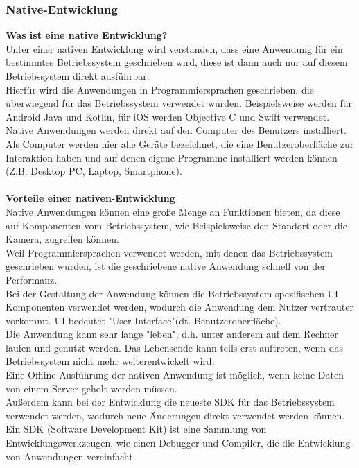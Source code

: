 \documentclass[ngerman]{article}
\begin{document}
    \subsubsection{Native-Entwicklung}
    \textbf{Was ist eine native Entwicklung?}\\
    Unter einer nativen Entwicklung wird verstanden, dass eine Anwendung für ein bestimmtes Betriebssystem geschrieben wird, diese ist dann auch nur auf diesem Betriebssystem direkt ausführbar.\\
    Hierfür wird die Anwendungen in Programmiersprachen geschrieben, die überwiegend für das Betriebssystem verwendet wurden. Beispielsweise werden für Android Java und Kotlin, für iOS werden Objective C und Swift verwendet.\\
    Native Anwendungen werden direkt auf den Computer des Benutzers installiert.\cite{Native Application Development} Als Computer werden hier alle Geräte bezeichnet, die eine Benutzeroberfläche zur Interaktion haben und auf denen eigene Programme installiert werden können (Z.B. Desktop PC, Laptop, Smartphone).\\\\
    \textbf{Vorteile einer nativen-Entwicklung}\\
    Native Anwendungen können eine große Menge an Funktionen bieten, da diese auf Komponenten vom Betriebssystem, wie Beispielsweise den Standort oder die Kamera, zugreifen können.\\
    Weil Programmiersprachen verwendet werden, mit denen das Betriebssystem geschrieben wurden, ist die geschriebene native Anwendung schnell von der Performanz.\\
    Bei der Gestaltung der Anwendung können die Betriebssystem spezifischen UI Komponenten verwendet werden, wodurch die Anwendung dem Nutzer vertrauter vorkommt. \cite{Native Application Development} UI bedeutet "User Interface"(dt. Benutzeroberfläche).\\
    Die Anwendung kann sehr lange "leben", d.h. unter anderem auf dem Rechner laufen und genutzt werden. Das Lebensende kann teils erst auftreten, wenn das Betriebssystem nicht mehr weiterentwickelt wird.\\
    Eine Offline-Ausführung der nativen Anwendung ist möglich, wenn keine Daten von einem Server geholt werden müssen.\\
    Außerdem kann bei der Entwicklung die neueste SDK für das Betriebssystem verwendet werden, wodurch neue Änderungen direkt verwendet werden können.\cite{NativeAdvantages} Ein SDK (Software Development Kit) ist eine Sammlung von Entwicklungswerkzeugen, wie einen Debugger und Compiler, die die Entwicklung von Anwendungen vereinfacht.\\\\
\end{document}
